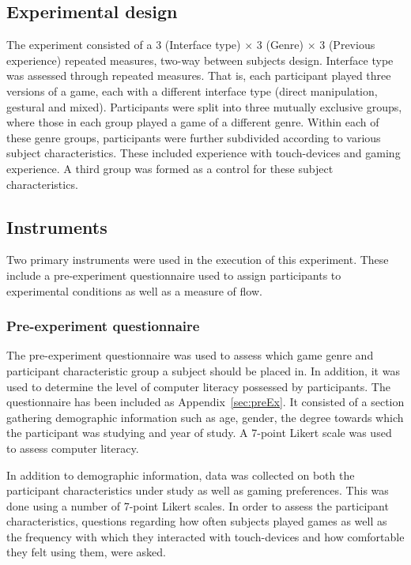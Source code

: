 \subsection{Experimental design}
The experiment consisted of a 3 (Interface type) $\times$ 3 (Genre) $\times$ 3 (Previous experience) repeated measures, two-way between subjects design. Interface type was assessed through repeated measures. That is, each participant played three versions of a game, each with a different interface type (direct manipulation, gestural and mixed). Participants were split into three mutually exclusive groups, where those in each group played a game of a different genre. Within each of these genre groups, participants were further subdivided according to various subject characteristics. These included experience with touch-devices and gaming experience. A third group was formed as a control for these subject characteristics.

\subsection{Instruments}
Two primary instruments were used in the execution of this experiment. These include a pre-experiment questionnaire used to assign participants to experimental conditions as well as a measure of flow.

\subsubsection{Pre-experiment questionnaire}
The pre-experiment questionnaire was used to assess which game genre and participant characteristic group a subject should be placed in. In addition, it was used to determine the level of computer literacy possessed by participants. The questionnaire has been included as Appendix~\ref{sec:preEx}. It consisted of a section gathering demographic information such as age, gender, the degree towards which the participant was studying and year of study. A 7-point Likert scale was used to assess computer literacy. 

In addition to demographic information, data was collected on both the participant characteristics under study as well as gaming preferences. This was done using a number of 7-point Likert scales. In order to assess the participant characteristics, questions regarding how often subjects played games as well as the frequency with which they interacted with touch-devices and how comfortable they felt using them, were asked.

